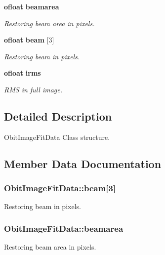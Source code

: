 \begin{CompactItemize}
{\bf ofloat} {\bf beamarea}
\begin{CompactList}\small\item\em Restoring beam area in pixels. \item\end{CompactList}\item 
{\bf ofloat} {\bf beam} [3]
\begin{CompactList}\small\item\em Restoring beam in pixels. \item\end{CompactList}\item 
{\bf ofloat} {\bf irms}
\begin{CompactList}\small\item\em RMS in full image. \item\end{CompactList}\end{CompactItemize}


\subsection{Detailed Description}
Obit\-Image\-Fit\-Data Class structure. 



\subsection{Member Data Documentation}
\subsubsection{ {\bf Obit\-Image\-Fit\-Data::beam}[3]}\label{structObitImageFitData_o23}


Restoring beam in pixels. 

\subsubsection{ {\bf Obit\-Image\-Fit\-Data::beamarea}}\label{structObitImageFitData_o22}


Restoring beam area in pixels. 

